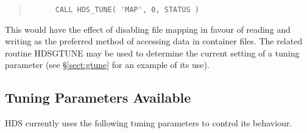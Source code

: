 \documentclass[twoside,11pt]{article}
\newcommand{\htmlref}[2]{#1}
\newcommand{\xlabel}[1]{}
\renewcommand{\_}{\texttt{\symbol{95}}}
\begin{document}
\begin{description}
\small
\begin{quote}
\begin{verbatim}
      CALL HDS_TUNE( 'MAP', 0, STATUS )
\end{verbatim}
\end{quote}
\normalsize

This would have the effect of disabling file mapping in favour of
reading and writing as the preferred method of accessing data in
container files. The related routine \htmlref{HDS\_GTUNE}{HDS_GTUNE}
may be used to determine the current setting of a tuning parameter
(see \S\ref{sect:gtune} for an example of its use).

\end{description}

\subsection{\xlabel{tuning_parameters_available}\label{sect:tuning_parameters}Tuning Parameters Available}

HDS currently uses the following tuning parameters to control its
behaviour.
\end{document}
